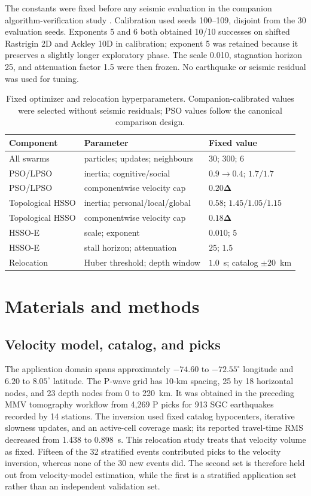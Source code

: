 \documentclass[10pt]{article}
\begin{document}
The constants were fixed before any seismic evaluation in the companion algorithm-verification study \citep{Parra2026Companion}. Calibration used seeds 100--109, disjoint from the 30 evaluation seeds. Exponents 5 and 6 both obtained 10/10 successes on shifted Rastrigin 2D and Ackley 10D in calibration; exponent 5 was retained because it preserves a slightly longer exploratory phase. The scale 0.010, stagnation horizon 25, and attenuation factor 1.5 were then frozen. No earthquake or seismic residual was used for tuning.

\begin{table}[H]
\centering\small
\caption{Fixed optimizer and relocation hyperparameters. Companion-calibrated values were selected without seismic residuals; PSO values follow the canonical comparison design.}
\label{tab:parameters}
\begin{tabular}{lll}
\toprule
Component & Parameter & Fixed value\\
\midrule
All swarms & particles; updates; neighbours & $30$; $300$; $6$\\
PSO/LPSO & inertia; cognitive/social & $0.9\rightarrow0.4$; $1.7/1.7$\\
PSO/LPSO & componentwise velocity cap & $0.20\bm\Delta$\\
Topological HSSO & inertia; personal/local/global & $0.58$; $1.45/1.05/1.15$\\
Topological HSSO & componentwise velocity cap & $0.18\bm\Delta$\\
HSSO-E & scale; exponent & $0.010$; $5$\\
HSSO-E & stall horizon; attenuation & $25$; $1.5$\\
Relocation & Huber threshold; depth window & $1.0$~s; catalog $\pm20$~km\\
\bottomrule
\end{tabular}
\end{table}

\section{Materials and methods}

\subsection{Velocity model, catalog, and picks}

The application domain spans approximately $-74.60$ to $-72.55^{\circ}$ longitude and $6.20$ to $8.05^{\circ}$ latitude. The P-wave grid has 10-km spacing, 25 by 18 horizontal nodes, and 23 depth nodes from 0 to 220~km. It was obtained in the preceding MMV tomography workflow from 4,269 P picks for 913 SGC earthquakes recorded by 14 stations. The inversion used fixed catalog hypocenters, iterative slowness updates, and an active-cell coverage mask; its reported travel-time RMS decreased from 1.438 to 0.898~s. This relocation study treats that velocity volume as fixed. Fifteen of the 32 stratified events contributed picks to the velocity inversion, whereas none of the 30 new events did. The second set is therefore held out from velocity-model estimation, while the first is a stratified application set rather than an independent validation set.
\end{document}
